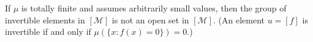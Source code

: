 If $\mu$ is totally finite and assumes arbitrarily small values, then the group of invertible elements in $[\mathcal{M}]$ is not an open set in $[\mathcal{M}]$. (An element $u = [f]$ is invertible if and only if $\mu(\{x : f(x) = 0\}) = 0$.)
